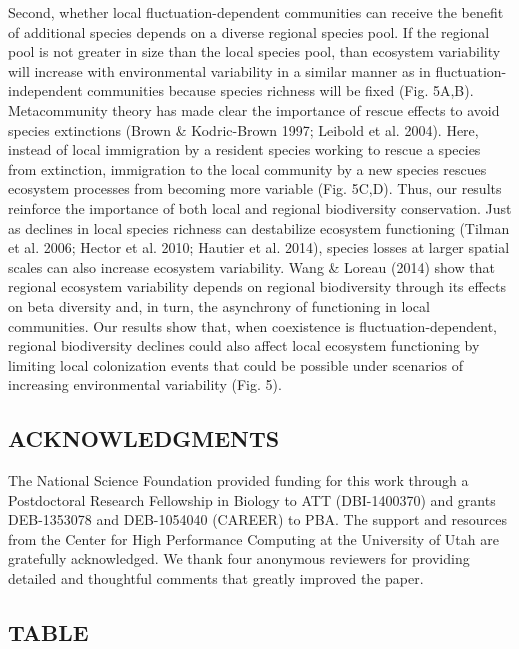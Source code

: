 \documentclass[12pt,]{article}
\begin{document}
Second, whether local fluctuation-dependent communities can receive the
benefit of additional species depends on a diverse regional species
pool. If the regional pool is not greater in size than the local species
pool, than ecosystem variability will increase with environmental
variability in a similar manner as in fluctuation-independent
communities because species richness will be fixed (Fig. 5A,B).
Metacommunity theory has made clear the importance of rescue effects to
avoid species extinctions (Brown \& Kodric-Brown 1997; Leibold et al.
2004). Here, instead of local immigration by a resident species working
to rescue a species from extinction, immigration to the local community
by a new species rescues ecosystem processes from becoming more variable
(Fig. 5C,D). Thus, our results reinforce the importance of both local
and regional biodiversity conservation. Just as declines in local
species richness can destabilize ecosystem functioning (Tilman et al.
2006; Hector et al. 2010; Hautier et al. 2014), species losses at larger
spatial scales can also increase ecosystem variability. Wang \& Loreau
(2014) show that regional ecosystem variability depends on regional
biodiversity through its effects on beta diversity and, in turn, the
asynchrony of functioning in local communities. Our results show that,
when coexistence is fluctuation-dependent, regional biodiversity
declines could also affect local ecosystem functioning by limiting local
colonization events that could be possible under scenarios of increasing
environmental variability (Fig. 5).

\subsection{ACKNOWLEDGMENTS}\label{acknowledgments}

The National Science Foundation provided funding for this work through a
Postdoctoral Research Fellowship in Biology to ATT (DBI-1400370) and
grants DEB-1353078 and DEB-1054040 (CAREER) to PBA. The support and
resources from the Center for High Performance Computing at the
University of Utah are gratefully acknowledged. We thank four anonymous
reviewers for providing detailed and thoughtful comments that greatly
improved the paper.

\newpage{}

\subsection{TABLE}\label{table}
\end{document}
